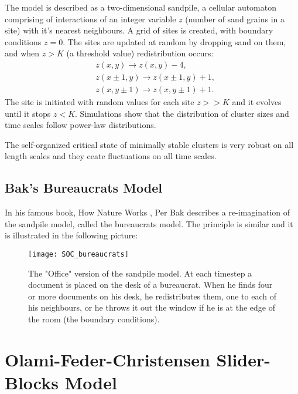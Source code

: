 The model is described as a two-dimensional sandpile, a cellular automaton comprising of interactions of an integer variable $z$ (number of sand grains in a site) with it's nearest neighbours. A grid of sites is created, with boundary conditions $z=0$. The sites are updated at random by dropping sand on them, and when $z>K$ (a threshold value) redistribution occurs:
\begin{align}
&z(x,y) \to z(x,y)-4, \\
&z(x\pm 1,y) \to z(x \pm 1,y)+1, \\
&z(x,y\pm 1) \to z(x,y\pm 1)+1.
\end{align}
The site is initiated with random values for each site $z>>K$ and it evolves until it stops $z<K$. Simulations show that the distribution of cluster sizes and time scales follow power-law distributions.\par 
The self-organized critical state of minimally stable clusters is very robust on all length scales and they ceate fluctuations on all time scales.



\subsection{Bak's Bureaucrats Model}
In his famous book, How Nature Works \cite{natureworks}, Per Bak describes a re-imagination of the sandpile model, called the bureaucrats model. The principle is similar and it is illustrated in the following picture:

\begin{figure}[!h]
  \centering
  \texttt{[image: SOC\_bureaucrats]}
  \caption{The "Office" version of the sandpile model. At each timestep a document is placed on the desk of a bureaucrat. When he finds four or more documents on his desk, he redistributes them, one to each of his neighbours, or he throws it out the window if he is at the edge of the room (the boundary conditions).}
  \label{fig:bureaucrats}
\end{figure}


\section{Olami-Feder-Christensen Slider-Blocks Model }

